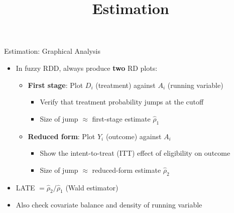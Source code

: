 \documentclass[hyperref={pdfpagelabels=false}]{beamer}
\begin{document}
\title[]
{Estimation}

\author
{}

\institute{}

\date
{}

\begin{frame}{}
	\titlepage
\end{frame}


\begin{frame}{Estimation: Graphical Analysis}{}
	\begin{itemize}
		\item In fuzzy RDD, always produce \textbf{two} RD plots:
		\vspace{0.2cm}
		\begin{itemize}
			\item \textbf{First stage}: Plot $D_i$ (treatment) against $A_i$ (running variable)
			\vspace{0.2cm}
			\begin{itemize}
				\item Verify that treatment probability jumps at the cutoff
				\vspace{0.2cm}
				\item Size of jump $\approx$ first-stage estimate $\hat{\rho}_1$
			\end{itemize}
			\vspace{0.2cm}
			\item \textbf{Reduced form}: Plot $Y_i$ (outcome) against $A_i$
			\vspace{0.2cm}
			\begin{itemize}
				\item Show the intent-to-treat (ITT) effect of eligibility on outcome
				\vspace{0.2cm}
				\item Size of jump $\approx$ reduced-form estimate $\hat{\rho}_2$
			\end{itemize}
		\end{itemize}
		\vspace{0.2cm}
		\item LATE $= \hat{\rho}_2 / \hat{\rho}_1$ (Wald estimator)
		\vspace{0.2cm}
		\item Also check covariate balance and density of running variable
	\end{itemize}
\end{frame}
\end{document}
